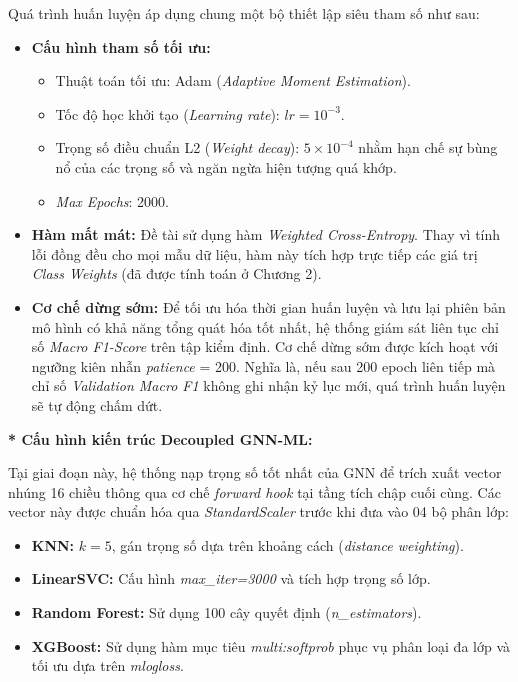Quá trình huấn luyện áp dụng chung một bộ thiết lập siêu tham số như sau:
\begin{itemize}[label={--}, itemsep=1pt]
    \item \textbf{Cấu hình tham số tối ưu:} 
    \begin{itemize}[label={+}, itemsep=1pt]
        \item Thuật toán tối ưu: Adam (\textit{Adaptive Moment Estimation}).
        \item Tốc độ học khởi tạo (\textit{Learning rate}): $lr = 10^{-3}$.
        \item Trọng số điều chuẩn L2 (\textit{Weight decay}): $5 \times 10^{-4}$ nhằm hạn chế sự bùng nổ của các trọng số và ngăn ngừa hiện tượng quá khớp.
        \item \textit{Max Epochs}: 2000.
    \end{itemize}
    
    \item \textbf{Hàm mất mát:} Đề tài sử dụng hàm \textit{Weighted Cross-Entropy}. Thay vì tính lỗi đồng đều cho mọi mẫu dữ liệu, hàm này tích hợp trực tiếp các giá trị \textit{Class Weights} (đã được tính toán ở Chương 2).
    
    \item \textbf{Cơ chế dừng sớm:} Để tối ưu hóa thời gian huấn luyện và lưu lại phiên bản mô hình có khả năng tổng quát hóa tốt nhất, hệ thống giám sát liên tục chỉ số \textit{Macro F1-Score} trên tập kiểm định. Cơ chế dừng sớm được kích hoạt với ngưỡng kiên nhẫn \textit{patience} = 200. Nghĩa là, nếu sau 200 epoch liên tiếp mà chỉ số \textit{Validation Macro F1} không ghi nhận kỷ lục mới, quá trình huấn luyện sẽ tự động chấm dứt.
\end{itemize}

\textbf{* Cấu hình kiến trúc Decoupled GNN-ML:}\vspace{0.2cm}

Tại giai đoạn này, hệ thống nạp trọng số tốt nhất của GNN để trích xuất vector nhúng 16 chiều thông qua cơ chế \textit{forward hook} tại tầng tích chập cuối cùng. Các vector này được chuẩn hóa qua \textit{StandardScaler} trước khi đưa vào 04 bộ phân lớp:
\begin{itemize}[label={--}, itemsep=1pt]
    \item \textbf{KNN:} $k=5$, gán trọng số dựa trên khoảng cách (\textit{distance weighting}).
    \item \textbf{LinearSVC:} Cấu hình \textit{max\_iter=3000} và tích hợp trọng số lớp.
    \item \textbf{Random Forest:} Sử dụng 100 cây quyết định (\textit{n\_estimators}).
    \item \textbf{XGBoost:} Sử dụng hàm mục tiêu \textit{multi:softprob} phục vụ phân loại đa lớp và tối ưu dựa trên \textit{mlogloss}.
\end{itemize}

